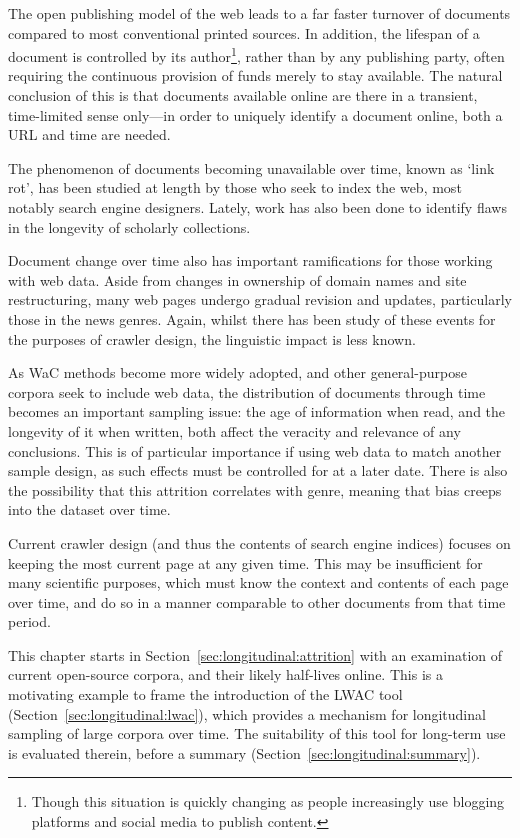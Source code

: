 The open publishing model of the web leads to a far faster turnover of documents compared to most conventional printed sources.  In addition, the lifespan of a document is controlled by its author\footnote{Though this situation is quickly changing as people increasingly use blogging platforms and social media to publish content.}, rather than by any publishing party, often requiring the continuous provision of funds merely to stay available.  The natural conclusion of this is that documents available online are there in a transient, time-limited sense only---in order to uniquely identify a document online, both a URL and time are needed.

The phenomenon of documents becoming unavailable over time, known as `link rot', has been studied at length by those who seek to index the web, most notably search engine designers.  Lately, work has also been done to identify flaws in the longevity of scholarly collections\cite{101371journalpone0115253}.

Document change over time also has important ramifications for those working with web data.  Aside from changes in ownership of domain names and site restructuring, many web pages undergo gradual revision and updates, particularly those in the news genres.  Again, whilst there has been study of these events for the purposes of crawler design, the linguistic impact is less known.

As WaC methods become more widely adopted, and other general-purpose corpora seek to include web data, the distribution of documents through time becomes an important sampling issue: the age of information when read, and the longevity of it when written, both affect the veracity and relevance of any conclusions.  This is of particular importance if using web data to match another sample design, as such effects must be controlled for at a later date.
There is also the possibility that this attrition correlates with genre, meaning that bias creeps into the dataset over time.

Current crawler design (and thus the contents of search engine indices) focuses on keeping the most current page at any given time.  This may be insufficient for many scientific purposes, which must know the context and contents of each page over time, and do so in a manner comparable to other documents from that time period.

This chapter starts in Section~\ref{sec:longitudinal:attrition} with an examination of current open-source corpora, and their likely half-lives online.  This is a motivating example to frame the introduction of the LWAC tool (Section~\ref{sec:longitudinal:lwac}), which provides a mechanism for longitudinal sampling of large corpora over time.  The suitability of this tool for long-term use is evaluated therein, before a summary (Section~\ref{sec:longitudinal:summary}).


